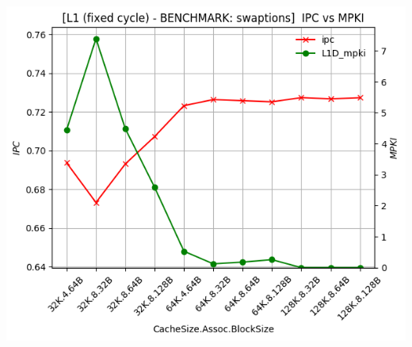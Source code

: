 \begin{minipage}{\textwidth}
    \begin{center}
        \\
        \vspace{3mm}
        \includegraphics[scale=0.70]{graphs/L1/fixed/swaptions.png}
        \vspace{6mm}
    \end{center}
\end{minipage}

